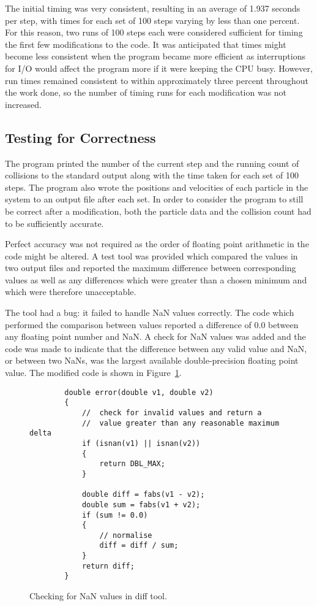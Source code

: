 \documentclass[11pt, oneside]{article}   %
\begin{document}
The initial timing was very consistent, resulting in an average of 1.937 seconds per step, with times for each set of 100 steps varying by less than one percent.
For this reason, two runs of 100 steps each were considered sufficient for timing the first few modifications to the code.
It was anticipated that times might become less consistent when the program became more efficient as interruptions for I/O would affect the program more if it were keeping the CPU busy.
However, run times remained consistent to within approximately three percent throughout the work done, so the number of timing runs for each modification was not increased.

\subsection{Testing for Correctness}

The program printed the number of the current step and the running count of collisions to the standard output along with the time taken for each set of 100 steps.
The program also wrote the positions and velocities of each particle in the system to an output file after each set.
In order to consider the program to still be correct after a modification, both the particle data and the collision count had to be sufficiently accurate.  

Perfect accuracy was not required as the order of floating point arithmetic in the code might be altered.
A test tool was provided which compared the values in two output files and reported the maximum difference between corresponding values as well as any differences which were greater than a chosen minimum and which were therefore unacceptable.  

The tool had a bug: it failed to handle NaN values correctly.
The code which performed the comparison between values reported a difference of 0.0 between any floating point number and NaN.
A check for NaN values was added and the code was made to indicate that the difference between any valid value and NaN, or between two NaNs, was the largest available double-precision floating point value.
The modified code is shown in Figure~\ref{fig:NanTest}.

\begin{figure}
	\begin{lstlisting}
		double error(double v1, double v2)
		{
			//  check for invalid values and return a 
			//  value greater than any reasonable maximum delta
			if (isnan(v1) || isnan(v2))
			{
				return DBL_MAX;
			}

			double diff = fabs(v1 - v2);
			double sum = fabs(v1 + v2);
			if (sum != 0.0)
			{
				// normalise
				diff = diff / sum;
			}
			return diff;
		}
	\end{lstlisting}
	\caption{Checking for NaN values in diff tool.}
	\label{fig:NanTest}
\end{figure}
\end{document}
